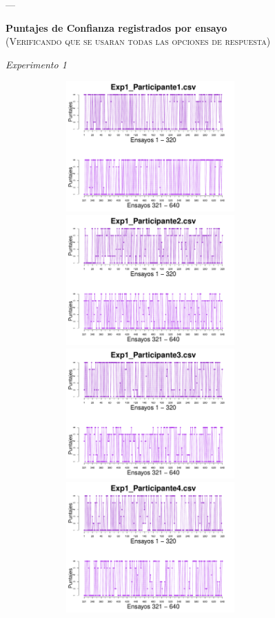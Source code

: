 \documentclass[a4paper ]{article}
\begin{document}
---
\vspace{3mm}
\begin{center}
{\LARGE \textbf{Puntajes de Confianza registrados por ensayo}}\\
{\small \textsc{(Verificando que se usaran todas las opciones de respuesta)}}\\
\smallskip
\end{center}
\begin{center}
{\LARGE \textit{Experimento 1}}\\
\end{center}
\vspace{3mm}
\begin{figure}[th]
\centering
\includegraphics[width=9cm, height=5cm]{Figures/Rating_Exp1_P1} \includegraphics[width=9cm, height=5cm]{Figures/Rating_Exp1_P2} 
\includegraphics[width=9cm, height=5cm]{Figures/Rating_Exp1_P3} \includegraphics[width=9cm, height=5cm]{Figures/Rating_Exp1_P4} 

\end{figure}
\end{document}
